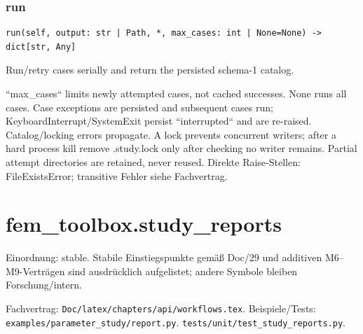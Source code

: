 \subsubsection*{run}
\begin{lstlisting}
run(self, output: str | Path, *, max_cases: int | None=None) -> dict[str, Any]
\end{lstlisting}
Run/retry cases serially and return the persisted schema-1 catalog.\par ``max\_cases`` limits newly attempted cases, not cached successes. None runs all cases. Case exceptions are persisted and subsequent cases run; KeyboardInterrupt/SystemExit persist ``interrupted`` and are re-raised. Catalog/locking errors propagate. A lock prevents concurrent writers; after a hard process kill remove .study.lock only after checking no writer remains. Partial attempt directories are retained, never reused.
Direkte Raise-Stellen: FileExistsError; transitive Fehler siehe Fachvertrag.
\section{fem\_toolbox.study\_reports}
Einordnung: stable. Stabile Einstiegspunkte gemäß Doc/29 und additiven M6–M9-Verträgen sind ausdrücklich aufgelistet; andere Symbole bleiben Forschung/intern.
\par Fachvertrag: \nolinkurl{Doc/latex/chapters/api/workflows.tex}. Beispiele/Tests:
\nolinkurl{examples/parameter_study/report.py}.
\nolinkurl{tests/unit/test_study_reports.py}.
